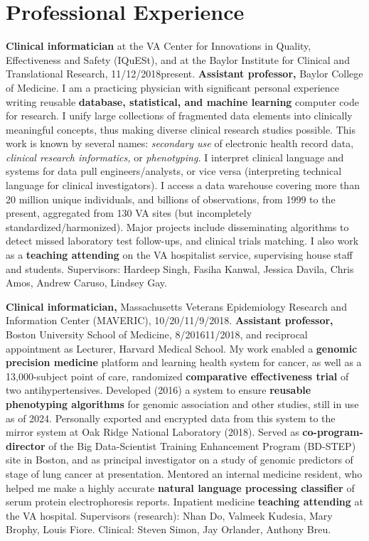 \documentclass[10pt]{article}
\begin{document}
\section{Professional Experience} %

\textbf{Clinical informatician} at the VA Center for Innovations in
Quality, Effectiveness and Safety (IQuESt), and at the Baylor
Institute for Clinical and Translational Research,
11/12/2018\ndash{}present. \textbf{Assistant professor,} Baylor
College of Medicine. I am a practicing physician with significant
personal experience writing reusable \textbf{database, statistical,
  and machine learning} computer code for research. I unify large
collections of fragmented data elements into clinically meaningful
concepts, thus making diverse clinical research studies possible. This
work is known by several names: \emph{secondary use} of electronic
health record data, \emph{clinical research informatics,} or
\emph{phenotyping.} I interpret clinical language and systems for data
pull engineers/analysts, or vice versa (interpreting technical
language for clinical investigators). I access a data warehouse
covering more than 20 million unique individuals, and billions of
observations, from 1999 to the present, aggregated from 130 VA sites
(but incompletely standardized/harmonized). Major projects include
disseminating algorithms to detect missed laboratory test follow-ups,
and clinical trials matching. I also work as a \textbf{teaching
  attending} on the VA hospitalist service, supervising house staff
and students. Supervisors: Hardeep Singh, Fasiha Kanwal, Jessica
Davila, Chris Amos, Andrew Caruso, Lindsey Gay.

\textbf{Clinical informatician,} Massachusetts Veterans Epidemiology
Research and Information Center (MAVERIC),
10/20/\ndash{}11/9/2018. \textbf{Assistant
  professor,} Boston University School of Medicine,
8/2016\ndash{}11/2018, and reciprocal appointment as Lecturer, Harvard
Medical School. My work enabled a \textbf{genomic precision medicine}
platform and learning health system for cancer, as well as a
13,000-subject point of care, randomized \textbf{comparative
  effectiveness trial} of two antihypertensives. Developed (2016) a
system to ensure \textbf{reusable phenotyping algorithms} for genomic
association and other studies, still in use as of 2024. Personally
exported and encrypted data from this system to the mirror system at
Oak Ridge National Laboratory (2018). Served as
\textbf{co-program-director} of the Big Data-Scientist Training
Enhancement Program (BD-STEP) site in Boston, and as principal
investigator on a study of genomic predictors of stage of lung cancer
at presentation. Mentored an internal medicine resident, who helped me
make a highly accurate \textbf{natural language processing classifier}
of serum protein electrophoresis reports. Inpatient medicine
\textbf{teaching attending} at the VA hospital. Supervisors
(research): Nhan Do, Valmeek Kudesia, Mary Brophy, Louis Fiore.
Clinical: Steven Simon, Jay Orlander, Anthony Breu.
\end{document}
